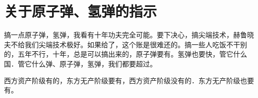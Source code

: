 \section[关于原子弹、氢弹的指示（一九五八年六月）]{关于原子弹、氢弹的指示}


搞一点原子弹，氢弹，我看有十年功夫完全可能。要下决心，搞尖端技术，赫鲁晓夫不给我们尖端技术极好。如果给了，这个账是很难还的。搞一些人吃饭不干别的，五年不行，十年，总是可以搞出来的，原子弹要有。氢弹也要快，管它什么国．管它什么弹、原子弹，氢弹，我们都要超过。

西方资产阶级有的，东方无产阶级要有，西方资产阶级没有的．东方无产阶级也要有。


